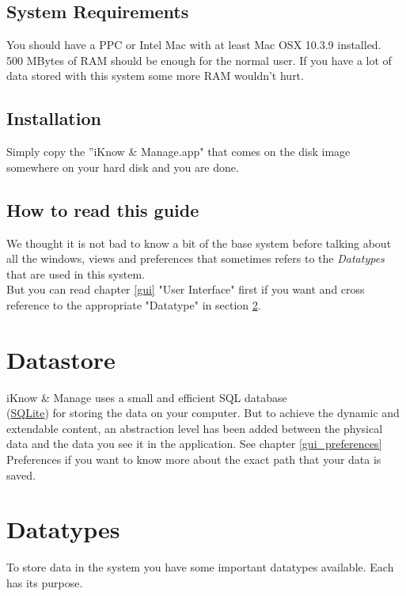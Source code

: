 \documentclass[12pt,a4]{article}
\begin{document}
\subsection{System Requirements}
\label{requirements}
\medskip
You should have a PPC or Intel Mac with at least Mac OSX 10.3.9 installed. \\
500 MBytes of RAM should be enough for the normal user. If you have a lot of data stored with this system some more RAM wouldn't hurt.
\subsection{Installation}
\label{installation}
\medskip
Simply copy the ''iKnow \& Manage.app" that comes on the disk image somewhere on your hard disk and you are done.
\subsection{How to read this guide}
\label{how_to_read}
\medskip
We thought it is not bad to know a bit of the base system before talking about all the windows, views and preferences that sometimes refers to the \textit{Datatypes} that are used in this system. \\
But you can read chapter \ref{gui} "User Interface" first if you want and cross reference to the appropriate "Datatype" in section \ref{datatypes}.
\newpage
\section{Datastore}
\label{datastore}
\medskip
iKnow \& Manage uses a small and efficient SQL database \\
(\href{http://www.sqlite.org}{SQLite}) for storing the data on your computer. But to achieve the dynamic and extendable content, an abstraction level has been added between the physical data and the data you see it in the application. See chapter \ref{gui_preferences} Preferences if you want to know more about the exact path that your data is saved.
\section{Datatypes}
\label{datatypes}
\medskip
To store data in the system you have some important datatypes available. Each has its purpose.
\end{document}
